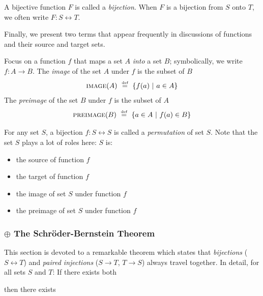 \begin{enumerate}
A bijective function $F$ is called a {\it bijection}.  When $F$ is a bijection from $S$ onto $T$, we often write $F: S \leftrightarrow T$.
\end{enumerate}

\medskip

Finally, we present two terms that appear frequently in discussions of functions and their source and target sets.

\smallskip

 
Focus on a function $f$ that maps a set $A$ {\em into} a set $B$; symbolically, we write $f: A \rightarrow B$.  The {\it image} of the set $A$ under $f$ is the subset of $B$
\[  \mbox{\sc image}(A) \ \stackrel{\mbox{{\tiny def}}}{=} \  \{f(a) \ | \ a \in A\} \]
The {\it preimage} of the set $B$ under $f$ is the subset of $A$
\[  \mbox{\sc preimage}(B) \ \stackrel{\mbox{{\tiny def}}}{=} \  \{a \in A \ | \ f(a) \in B\} \]


\smallskip

 

\noindent
For any set $S$, a bijection $f: S \leftrightarrow S$ is called a {\it permutation} of set $S$.   Note that the set $S$ plays a lot of roles here: $S$ is:
\begin{itemize}
\item
the source of function $f$
\medskip\item
the target of function $f$
\medskip\item
the image of set $S$ under function $f$
\medskip\item
the preimage of set $S$ under function $f$
\end{itemize}


\subsubsection{$\oplus$ The Schr\"{o}der-Bernstein Theorem}
\label{sec:schroeder-bernstein}

This section is devoted to a remarkable theorem which states that {\em bijections} ($S \leftrightarrow T$) and {\em paired injections} ($S \rightarrow T$, $T \rightarrow S$) always travel together.  In detail, for all sets $S$ and $T$: If there exists both

\hspace*{.2in}{\em an injection from $S$ to $T$ and an injection from $T$ to $S$}

\noindent then there exists

